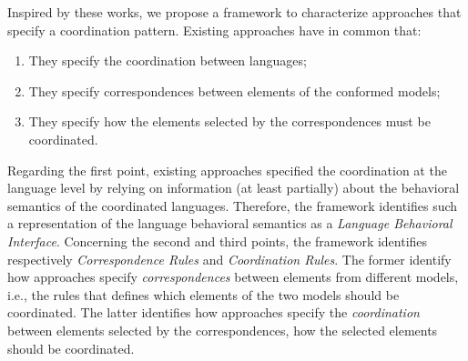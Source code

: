 Inspired by these works, we propose a framework to characterize approaches that specify a coordination pattern. Existing approaches have in common that:
\begin{enumerate}
	\item They specify the coordination between languages;
	
	\item They specify correspondences between elements of the conformed models;
	
	\item They specify how the elements selected by the correspondences must be coordinated.
\end{enumerate}	
Regarding the first point, existing approaches specified the coordination at the language level by relying on information (at least partially) about the behavioral semantics of the coordinated languages. Therefore, the framework identifies such a representation of the language behavioral semantics as a \emph{Language Behavioral Interface}. Concerning the second and third points, the framework identifies respectively \emph{Correspondence Rules} and \emph{Coordination Rules}. The former identify how approaches specify \emph{correspondences} between elements from different models, i.e., the rules that defines which elements of the two models should be coordinated.
The latter identifies how approaches specify the \emph{coordination} between elements selected by the correspondences, \ie how the selected elements should be coordinated.

